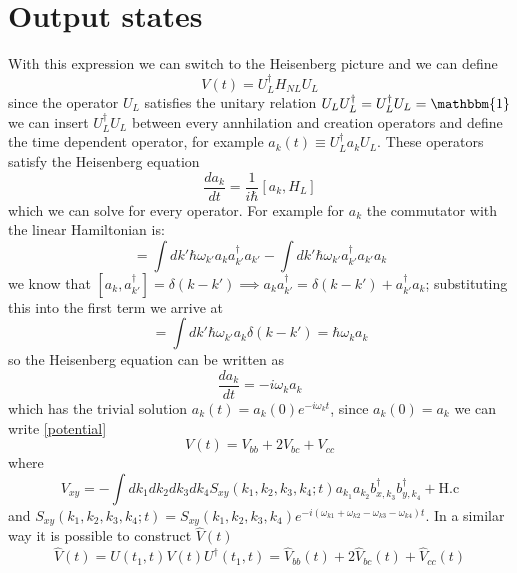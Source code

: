 \section{Output states}
With this expression we can switch to the Heisenberg picture and we can define
\begin{equation}\label{potential}
V(t) = U_L^\dagger H_{NL}U_{L}\end{equation}
since the operator $U_L$ satisfies the unitary relation $U_L U_L^\dagger = U_L^\dagger U_L = \mathbbm{1}$ we can insert $U_L^\dagger U_L$ between every annhilation and creation operators and define the time dependent operator, for example $a_{k}(t) \equiv U_L^\dagger a_{k}U_L$. These operators satisfy the Heisenberg equation
\begin{equation}\frac{da_{k}}{dt} = \frac{1}{i\hbar}[a_{k},H_L]\end{equation}
which we can solve for every operator. For example for $a_{k}$ the commutator with the linear Hamiltonian is:
\begin{equation}[a_{k},H_L] = \int dk'\hbar \omega_{k'}a_{k} a_{k'}^\dagger a_{k'}-\int dk'\hbar \omega_{k'}a_{k'}^\dagger a_{k'}a_{k}\end{equation}
we know that $[a_k,a_{k'}^\dagger] = \delta(k-k')\implies a_{k} a_{k'}^\dagger = \delta(k-k') + a_{k'}^\dagger a_{k}$; substituting this into the first term we arrive at
\begin{equation}[a_{k},H_L] = \int dk'\hbar \omega_{k'}a_{k}\delta(k-k') = \hbar \omega_{k}a_{k}\end{equation}
so the Heisenberg equation can be written as
\begin{equation}\frac{da_{k}}{dt} = -i\omega_{k}a_{k}\end{equation}
which has the trivial solution $a_k(t) = a_k(0)e^{-i\omega_k t}$, since $a_k(0) = a_k$ we can write \eqref{potential} 
\begin{equation}V(t) = V_{bb} + 2V_{bc} + V_{cc}\end{equation}
where
\begin{equation}V_{xy} = -\int dk_1dk_2dk_3dk_4S_{xy}(k_1,k_2,k_3,k_4;t)a_{k_1}a_{k_2}b_{x,k_3}^\dagger b_{y,k_4}^\dagger +\text{H.c} \end{equation}
and $S_{xy}(k_1,k_2,k_3,k_4;t) = S_{xy}(k_1,k_2,k_3,k_4)e^{-i(\omega_{k1}+\omega_{k2}-\omega_{k3}-\omega_{k4})t}$. In a similar way it is possible to construct $\hat{V}(t)$
\begin{equation}\hat{V}(t) = U(t_1,t)V(t)U^\dagger(t_1,t) = \hat{V}_{bb}(t) + 2\hat{V}_{bc}(t) + \hat{V}_{cc}(t)\end{equation}
